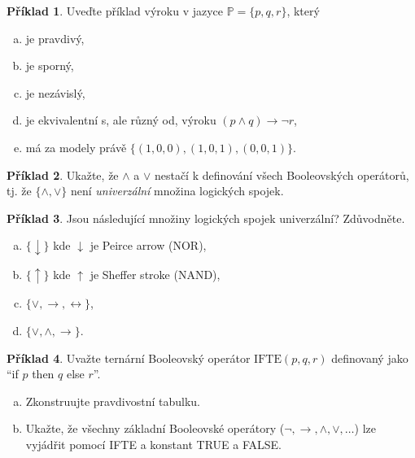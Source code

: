\documentclass[a4paper]{article}
\theoremstyle{definition}
\newtheorem{problem}{Příklad}
\begin{document}
\medskip\begin{problem}
    Uveďte příklad výroku v jazyce $\mathbb P=\{p,q,r\}$, který
    \begin{enumerate}[(a)]
    \item je pravdivý,
    \item je sporný,
    \item je nezávislý,
    \item je ekvivalentní s, ale různý od, výroku $(p\wedge q)\to\neg r$,
    \item má za modely právě $\{(1,0,0),(1,0,1),(0,0,1)\}$.
    \end{enumerate}
\end{problem}


\medskip\begin{problem}
Ukažte, že $\wedge$ a $\vee$ nestačí k definování všech Booleovských operátorů, tj. že $\{\wedge,\vee\}$ není \emph{univerzální} množina logických spojek.
\end{problem}

\medskip\begin{problem} Jsou následující množiny logických spojek univerzální? Zdůvodněte.
\begin{enumerate}[(a)]
    \item $\{\downarrow\}$ kde $\downarrow$ je Peirce arrow (NOR),
    \item $\{\uparrow\}$ kde $\uparrow$ je Sheffer stroke (NAND),
    \item $\{\vee, \rightarrow, \leftrightarrow\}$,
    \item $\{\vee, \wedge, \rightarrow\}$.
\end{enumerate}
\end{problem}


\medskip\begin{problem}
Uvažte ternární Booleovský operátor $\mathrm{IFTE}(p, q, r)$ definovaný jako ``if $p$ then $q$ else $r$''. 
\begin{enumerate}[(a)]
    \item Zkonstruujte pravdivostní tabulku.
    \item Ukažte, že všechny základní Booleovské operátory ($\neg, \to, \wedge,\vee,\dots$) lze vyjádřit pomocí IFTE a konstant TRUE a FALSE.
\end{enumerate}  
\end{problem}
\end{document}
